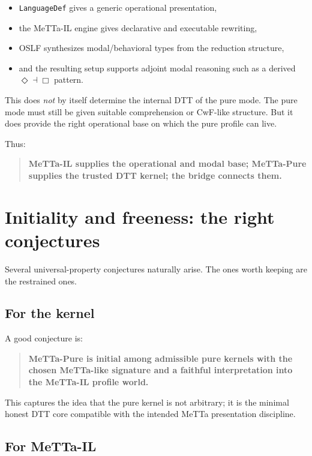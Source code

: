 \documentclass[11pt]{article}
\begin{document}
\begin{itemize}
  \item \texttt{LanguageDef} gives a generic operational presentation,
  \item the MeTTa-IL engine gives declarative and executable rewriting,
  \item OSLF synthesizes modal/behavioral types from the reduction structure,
  \item and the resulting setup supports adjoint modal reasoning such as a derived \(\Diamond \dashv \Box\) pattern.
\end{itemize}

This does \emph{not} by itself determine the internal DTT of the pure mode. The pure mode must still be given suitable comprehension or CwF-like structure. But it does provide the right operational base on which the pure profile can live.

Thus:

\begin{quote}
\textbf{MeTTa-IL supplies the operational and modal base; MeTTa-Pure supplies the trusted DTT kernel; the bridge connects them.}
\end{quote}

\section{Initiality and freeness: the right conjectures}

Several universal-property conjectures naturally arise. The ones worth keeping are the restrained ones.

\subsection{For the kernel}

A good conjecture is:

\begin{quote}
\textbf{MeTTa-Pure is initial among admissible pure kernels with the chosen MeTTa-like signature and a faithful interpretation into the MeTTa-IL profile world.}
\end{quote}

This captures the idea that the pure kernel is not arbitrary; it is the minimal honest DTT core compatible with the intended MeTTa presentation discipline.

\subsection{For MeTTa-IL}
\end{document}
